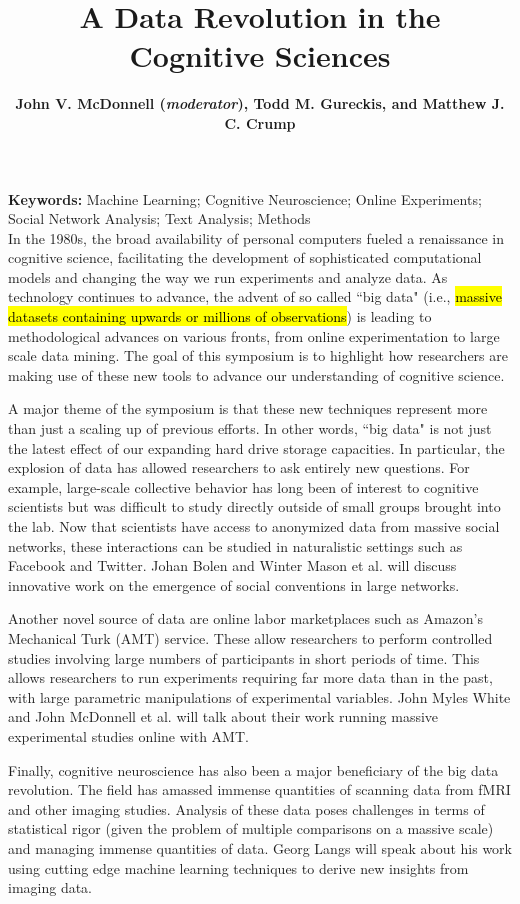\documentclass[10pt,letterpaper]{article}
\title{A Data Revolution in the Cognitive Sciences}
\author{{\large \bf John V. McDonnell (\emph{moderator}), Todd M. Gureckis,
and
Matthew J. C. Crump}
  \AND {\large \bf Johan Bolen} 
  \AND {\large \bf Georg Langs} 
  \AND {\large \bf Winter Mason, Meeyoung Cha, Krishna Gummadi, Farshad Kooti, and Haeryun Yang}
  \AND {\large \bf John Myles White} }
\begin{document}
\maketitle


\textbf{Keywords:} 
Machine Learning; Cognitive Neuroscience; Online Experiments; Social Network
Analysis; Text Analysis; Methods\\

In the 1980s, the broad availability of personal computers fueled a 
renaissance in cognitive science, facilitating the development of sophisticated
computational models and changing the way we run experiments and
analyze data. As technology continues to advance, the advent
of so called ``big data" (i.e., \hl{massive datasets containing upwards or millions of 
observations}) is leading to methodological advances on various fronts, from
online experimentation to large scale data mining. The goal of this symposium is to 
highlight how researchers are making use of these new tools to advance our
understanding of cognitive science.

A major theme of the symposium is that these new techniques
represent more than just a scaling up of previous efforts.  In other words,
``big data" is not just the latest effect of our expanding hard drive storage
capacities.  In particular, the explosion of data has allowed researchers 
to ask entirely new questions. For example, large-scale collective behavior has
long been of interest to cognitive scientists but was difficult to study
directly outside of small groups brought into the lab. Now that scientists have 
access to anonymized data from massive social networks, these interactions can 
be studied in naturalistic settings such as Facebook and Twitter. Johan Bolen and
Winter Mason et al. will discuss innovative work on the emergence of social conventions 
in large networks.

Another novel source of data are online labor marketplaces such as Amazon's
Mechanical Turk (AMT) service. These allow researchers to perform controlled
studies involving large numbers of participants in short periods of time. This
allows researchers to run experiments requiring far more data than in the past,
with large parametric manipulations of experimental variables.  John Myles White 
and John McDonnell et al. will talk about their work running massive
experimental studies online with AMT.

Finally, cognitive neuroscience has also been a major beneficiary of the big data
revolution.  The field has amassed immense quantities of scanning data from fMRI
and other imaging studies.  Analysis of these data poses challenges in terms of
statistical rigor (given the problem of multiple comparisons on a massive scale)
and managing immense quantities of data. Georg Langs will speak about his work
using cutting edge machine learning techniques to derive new insights from
imaging data.
\end{document}
